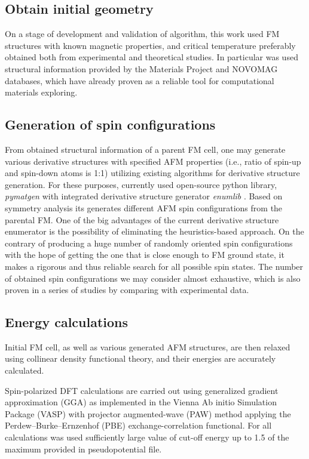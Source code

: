 \subsection{Obtain initial geometry}
On a stage of development and validation of algorithm, this work used FM structures with known magnetic properties, and critical temperature preferably obtained both from experimental and theoretical studies. In particular was used structural information provided by the Materials Project and NOVOMAG databases, which have already proven as a reliable tool for computational materials exploring. 

\subsection{Generation of spin configurations}
From obtained structural information of a parent FM cell, one may generate various derivative structures with specified AFM properties (i.e., ratio of spin-up and spin-down atoms is 1:1) utilizing existing algorithms for derivative structure generation. 
For these purposes, currently used open-source python library, \textit{pymatgen} \cite{Ong:2013vd} with integrated derivative structure generator \textit{enumlib} \cite{enum_1, enum_2, enum_3, enum_4}. Based on symmetry analysis its generates different AFM spin configurations from the parental FM. One of the big advantages of the current derivative structure enumerator is the possibility of eliminating the heuristics-based approach. On the contrary of producing a huge number of randomly oriented spin configurations with the hope of getting the one that is close enough to FM ground state, it makes a rigorous and thus reliable search for all possible spin states. The number of obtained spin configurations we may consider almost exhaustive, which is also proven in a series of studies by comparing with experimental data. 

\subsection{Energy calculations}

Initial FM cell, as well as various generated AFM structures, are then relaxed using collinear density functional theory,  and their energies are accurately calculated.  

Spin-polarized DFT calculations are carried out using generalized gradient approximation (GGA) as implemented in the Vienna Ab initio Simulation Package (VASP) \cite{Kresse_1996} with projector augmented-wave (PAW) \cite{Kresse_1999} method applying the Perdew–Burke–Ernzenhof (PBE) \cite{Perdew_1996} exchange-correlation functional. For all calculations was used sufficiently large value of cut-off energy up to 1.5 of the maximum provided in pseudopotential file.

